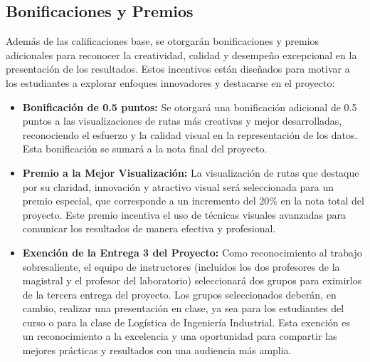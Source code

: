 \documentclass[12pt]{article}
\begin{document}
\subsection{Bonificaciones y Premios}

Además de las calificaciones base, se otorgarán bonificaciones y premios adicionales para reconocer la creatividad, calidad y desempeño excepcional en la presentación de los resultados. Estos incentivos están diseñados para motivar a los estudiantes a explorar enfoques innovadores y destacarse en el proyecto:

\begin{itemize}
    \item \textbf{Bonificación de 0.5 puntos:} Se otorgará una bonificación adicional de 0.5 puntos a las visualizaciones de rutas más creativas y mejor desarrolladas, reconociendo el esfuerzo y la calidad visual en la representación de los datos. Esta bonificación se sumará a la nota final del proyecto.

    \item \textbf{Premio a la Mejor Visualización:} La visualización de rutas que destaque por su claridad, innovación y atractivo visual será seleccionada para un premio especial, que corresponde a un incremento del 20\% en la nota total del proyecto. Este premio incentiva el uso de técnicas visuales avanzadas para comunicar los resultados de manera efectiva y profesional.

    \item \textbf{Exención de la Entrega 3 del Proyecto:} Como reconocimiento al trabajo sobresaliente, el equipo de instructores (incluidos los dos profesores de la magistral y el profesor del laboratorio) seleccionará dos grupos para eximirlos de la tercera entrega del proyecto. Los grupos seleccionados deberán, en cambio, realizar una presentación en clase, ya sea para los estudiantes del curso o para la clase de Logística de Ingeniería Industrial. Esta exención es un reconocimiento a la excelencia y una oportunidad para compartir las mejores prácticas y resultados con una audiencia más amplia.
\end{itemize}
\bigskip
\end{document}

